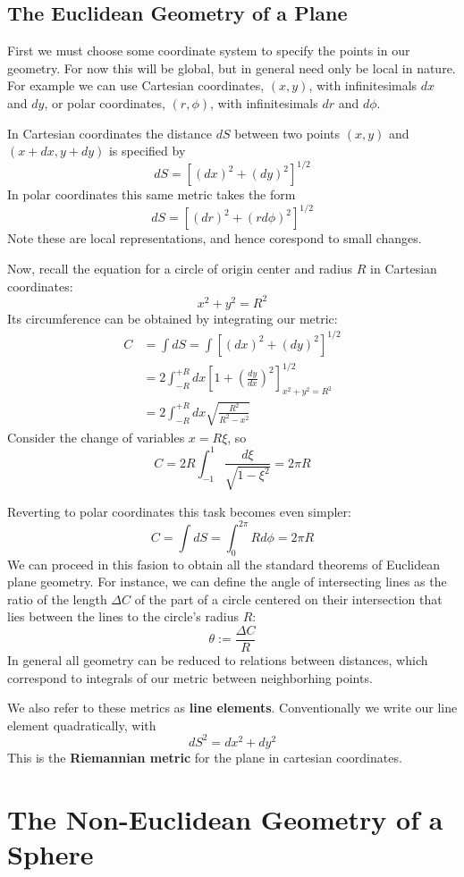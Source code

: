 \subsection{The Euclidean Geometry of a Plane}

First we must choose some coordinate system to specify the points in our geometry. For now this will be global, but in general need only be local in nature. For example we can use Cartesian coordinates, $(x,y)$, with infinitesimals $dx$ and $dy$, or polar coordinates, $(r,\phi)$, with infinitesimals $dr$ and $d\phi$.

In Cartesian coordinates the distance $dS$ between two points $(x,y)$ and $(x+dx,y+dy)$ is specified by $$dS = \left[(dx)^2+(dy)^2\right]^{1/2}$$
In polar coordinates this same metric takes the form $$dS = \left[(dr)^2+(rd\phi)^2\right]^{1/2}$$
Note these are local representations, and hence corespond to small changes.

Now, recall the equation for a circle of origin center and radius $R$ in Cartesian coordinates: $$x^2+y^2 = R^2$$
Its circumference can be obtained by integrating our metric: \begin{align*}
    C &= \int dS = \int\left[(dx)^2+(dy)^2\right]^{1/2} \\
    &= 2\int_{-R}^{+R}dx\left[1+\left(\frac{dy}{dx}\right)^2\right]^{1/2}_{x^2+y^2=R^2} \\
    &= 2\int_{-R}^{+R}dx\sqrt{\frac{R^2}{R^2-x^2}}
\end{align*}
Consider the change of variables $x = R\xi$, so $$C = 2R\int_{-1}^{1}\frac{d\xi}{\sqrt{1-\xi^2}} = 2\pi R$$

Reverting to polar coordinates this task becomes even simpler: $$C= \int dS = \int_0^{2\pi}Rd\phi = 2\pi R$$
We can proceed in this fasion to obtain all the standard theorems of Euclidean plane geometry. For instance, we can define the angle of intersecting lines as the ratio of the length $\Delta C$ of the part of a circle centered on their intersection that lies between the lines to the circle's radius $R$: $$\theta := \frac{\Delta C}{R}$$
In general all geometry can be reduced to relations between distances, which correspond to integrals of our metric between neighborhing points.

We also refer to these metrics as \textbf{line elements}. Conventionally we write our line element quadratically, with $$dS^2 = dx^2+dy^2$$
This is the \textbf{Riemannian metric} for the plane in cartesian coordinates.

\section{The Non-Euclidean Geometry of a Sphere}

